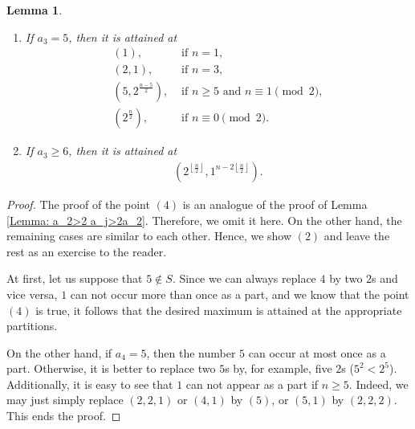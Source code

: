 \documentclass[12pt]{amsart}
\newtheorem{lemma}[theorem]{Lemma}
\theoremstyle{definition}
\theoremstyle{remark}
\numberwithin{theorem}{section} \numberwithin{equation}{section}
\newcommand{\floor}[1]{\left\lfloor #1 \right\rfloor}
\begin{document}
\begin{lemma}
\begin{enumerate}
\item If $a_3
=5$, then it is attained at 
\begin{align*}
(1), &\text{ if } n=1,\\
(2,1), &\text{ if } n=3,\\
(5,2^{\frac{n-5}{2}}), &\text{ if } n\geq 5\text{ and }n\equiv1\pmod{2},\\
 (2^{\frac{n}{2}}), &\text{ if } n\equiv0\pmod{2}.
\end{align*}


\item If $a_3\geq 6$, then it is attained at
\begin{align*}
(2^{\floor{\frac{n}{2}}},1^{n-2\floor{\frac{n}{2}}}).
\end{align*}
\end{enumerate}
\end{lemma}

\begin{proof}
The proof of the point $(4)$ is an analogue
of the proof of Lemma \ref{Lemma: a_2>2 a_j>2a_2}. Therefore, we omit it here. On the other hand, the remaining cases are similar to each other. Hence, we show $(2)$ and leave the rest as an exercise to the reader.

At first, let us suppose that $5\notin S$. Since we can always replace $4$ by
two $2$s and vice versa, $1$ can not occur more than once as a part, and we know that the point $(4)$ is true, it follows that the desired maximum is attained at the appropriate partitions.

On the other hand, if $a_4=5$, then the number $5$ can occur at most once as
a part. Otherwise, it is better to replace two $5$s by, for example, five
$2$s ($5^2<2^5$). Additionally, it is easy to see that $1$ can not appear as a part if $n\geq5$. Indeed, we may just simply replace $(2,2,1)$ or $(4,1)$ by $(5)$, or $(5,1)$ by $(2,2,2)$. This ends the proof.
\end{proof}

\end{document}
